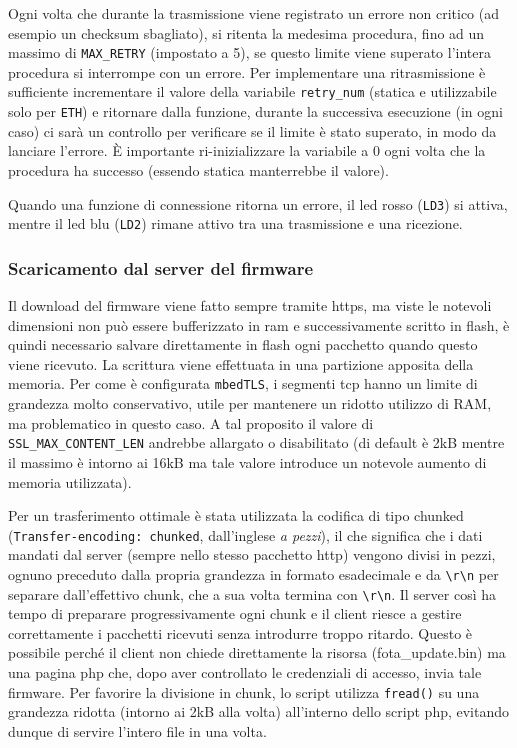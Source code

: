 Ogni volta che durante la trasmissione viene registrato un errore non critico (ad esempio un checksum sbagliato), si ritenta la medesima procedura, fino ad un massimo di \texttt{MAX\_RETRY} (impostato a 5), se questo limite viene superato l'intera procedura si interrompe con un errore. Per implementare una ritrasmissione \`e sufficiente incrementare il valore della variabile \texttt{retry\_num} (statica e utilizzabile solo per \texttt{ETH}) e ritornare dalla funzione, durante la successiva esecuzione (in ogni caso) ci sar\`a un controllo per verificare se il limite \`e stato superato, in modo da lanciare l'errore. \`E importante ri-inizializzare la variabile a 0 ogni volta che la procedura ha successo (essendo statica manterrebbe il valore).

Quando una funzione di connessione ritorna un errore, il led rosso (\texttt{LD3}) si attiva, mentre il led blu (\texttt{LD2}) rimane attivo tra una trasmissione e una ricezione.

\subsubsection{Scaricamento dal server del firmware}


Il download del firmware viene fatto sempre tramite https, ma viste le notevoli dimensioni non pu\`o essere bufferizzato in ram e successivamente scritto in flash, \`e quindi necessario salvare direttamente in flash ogni pacchetto quando questo viene ricevuto. La scrittura viene effettuata in una partizione apposita della memoria. Per come \`e configurata \texttt{mbedTLS}, i segmenti tcp hanno un limite di grandezza molto conservativo, utile per mantenere un ridotto utilizzo di RAM, ma problematico in questo caso. A tal proposito il valore di \texttt{SSL\_MAX\_CONTENT\_LEN} andrebbe allargato o disabilitato (di default \`e 2kB mentre il massimo \`e intorno ai 16kB ma tale valore introduce un notevole aumento di memoria utilizzata).

Per un trasferimento ottimale \`e stata utilizzata la codifica di tipo chunked (\texttt{Transfer-encoding: chunked}, dall'inglese \textit{a pezzi}), il che significa che i dati mandati dal server (sempre nello stesso pacchetto http) vengono divisi in pezzi, ognuno preceduto dalla propria grandezza in formato esadecimale e da \texttt{\textbackslash{r}\textbackslash{n}} per separare dall'effettivo chunk, che a sua volta termina con \texttt{\textbackslash{r}\textbackslash{n}}. Il server cos\`i ha tempo di preparare progressivamente ogni chunk e il client riesce a gestire correttamente i pacchetti ricevuti senza introdurre troppo ritardo. Questo \`e possibile perch\'e il client non chiede direttamente la risorsa (fota\_update.bin) ma una pagina php che, dopo aver controllato le credenziali di accesso, invia tale firmware. Per favorire la divisione in chunk, lo script utilizza \texttt{fread()} su una grandezza ridotta (intorno ai 2kB alla volta) all'interno dello script php, evitando dunque di servire l'intero file in una volta.

